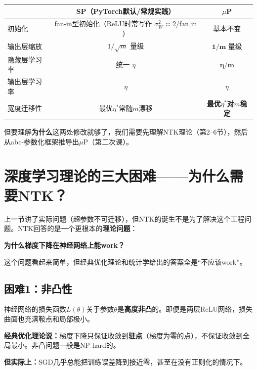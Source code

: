 \documentclass[11pt,a4paper]{article}
\begin{document}
\begin{center}
\renewcommand{\arraystretch}{1.3}
\begin{tabular}{l|cc}
\toprule
& SP（PyTorch默认/常规实践） & $\mu$P \\
\midrule
初始化 & fan-in型初始化（ReLU时常写作 $\sigma_W^2 \asymp 2/\mathrm{fan\_in}$） & 基本不变 \\
输出层缩放 & $1/\sqrt{m}$ 量级 & $\mathbf{1/m}$ 量级 \\
隐藏层学习率 & 统一 $\eta$ & $\mathbf{\eta/m}$ \\
输出层学习率 & $\eta$ & $\eta$ \\
宽度迁移性 & 最优$\eta^*$常随$m$漂移 & \textbf{最优$\eta^*$对$m$稳定} \\
\bottomrule
\end{tabular}
\end{center}

但要理解\textbf{为什么}这两处修改就够了，我们需要先理解NTK理论（第2--6节），然后从abc-参数化框架推导出$\mu$P（第二次课）。

\section{深度学习理论的三大困难——为什么需要NTK？}

上一节讲了实际问题（超参数不可迁移），但NTK的诞生不是为了解决这个工程问题。NTK回答的是一个更根本的\textbf{理论问题}：

\begin{tcolorbox}[colback=blue!5,colframe=blue!50!black,title=\textbf{深度学习理论的核心追问}]
\textbf{为什么梯度下降在神经网络上能work？}

这个问题看起来简单，但经典优化理论和统计学给出的答案全是``不应该work''。
\end{tcolorbox}

\subsection{困难1：非凸性}

神经网络的损失函数$L(\theta)$关于参数$\theta$是\textbf{高度非凸}的。即便是两层ReLU网络，损失曲面也充满鞍点和局部极小。

\textbf{经典优化理论说：}梯度下降只保证收敛到\textbf{驻点}（梯度为零的点），不保证收敛到全局最小。非凸问题一般是NP-hard的。

\textbf{但实际上：}SGD几乎总能把训练误差降到接近零，甚至在没有正则化的情况下。
\end{document}
